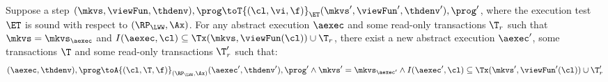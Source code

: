 \begin{lemma}
    \label{lem:aux-et-soundness-single-step-sound}
    Suppose a step \( (\mkvs, \viewFun, \thdenv), \prog \toT{(\cl, \vi, \f)}_{\ET} (\mkvs', \viewFun', \thdenv'), \prog' \), where the execution test \( \ET \) is sound with respect to \( (\RP_{\LWW}, \Ax) \).
    For any abstract execution \( \aexec \) and some read-only transactions \( \T_{r} \) such that \( \mkvs = \mkvs_\aexec \) and \( I(\aexec, \cl) \subseteq \Tx(\mkvs, \viewFun(\cl)) \cup \T_{r}\),
    there exist a new abstract execution \( \aexec' \), some transactions \( \T \) and some read-only transactions \( \T'_{r} \) such that: 
    \[
        (\aexec, \thdenv), \prog \toA{(\cl, \T, \f)}_{(\RP_{\LWW}, \Ax)} (\aexec', \thdenv'), \prog' \land \mkvs' = \mkvs_{\aexec'} 
        \land I(\aexec', \cl) \subseteq \Tx(\mkvs', \viewFun'(\cl)) \cup \T'_{r}
    \]
\end{lemma}
